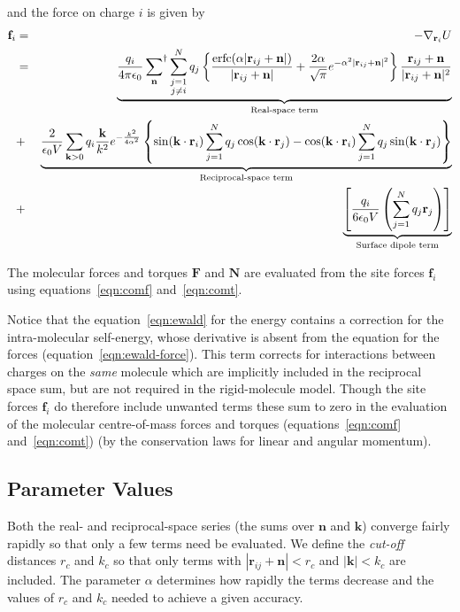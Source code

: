 \documentclass[a4paper,twoside]{report}
\providecommand{\bm}[1]{\mathbf{#1}}
\newcommand{\erfc}{\mbox{erfc}}
\begin{document}
and the force on charge $i$ is given by
\begin{eqnarray}
  \label{eqn:ewald-force}
  \bm{f}_i &=& - \nabla_{\bm{r}_i} U \nonumber \\
  & = & \underbrace{\frac{q_i}{4 \pi \epsilon_0}
    \sideset{}{^\dag}\sum_{\bm{n}} \sum_{\substack{j=1\\j \neq i}}^{N}
    q_j \left \lbrace \frac{\erfc( \alpha | \bm{r}_{ij} + \bm{n} |)}{|
        \bm{r}_{ij} +\bm{n} | } + \frac{2 \alpha}{\sqrt{\pi}}e^{-
        \alpha^2 | \bm{r}_{ij} + \bm{n} |^2} \right \rbrace
    \frac{\bm{r}_{ij} + \bm{n}}{| \bm{r}_{ij} + \bm{n} |^2}
    }_{\textnormal{Real-space term}} \nonumber \\
  & + & \underbrace{\frac{2}{\epsilon_0 V} \sum_{\bm{k} > 0} q_i
    \frac{\bm{k}}{k^2} e^{-\frac{k^2}{4 \alpha^2}} \left \lbrace
      \sin(\bm{k \cdot r}_i) \sum_{j=1}^{N} q_j \cos(\bm{k \cdot r}_j)
      - \cos(\bm{k \cdot r}_i) \sum_{j=1}^{N} q_j \sin(\bm{k \cdot
        r}_j)
    \right \rbrace}_{\textnormal{Reciprocal-space term}}\\
  & + & \underbrace{\left [ \frac{q_i}{6 \epsilon_0 V} \left (
        \sum_{j=1}^N q_j \bm{r}_j \right ) \right
    ]}_{\textnormal{Surface dipole term}} \nonumber
\end{eqnarray}

The molecular forces and torques $\bm{F}$ and $\bm{N}$ are evaluated
from the site forces $\bm{f}_i$ using equations~\ref{eqn:comf} 
and~\ref{eqn:comt}.

Notice that the equation~\ref{eqn:ewald} for the energy contains a
correction for the intra-molecular self-energy, whose derivative is
absent from the equation for the forces
(equation~\ref{eqn:ewald-force}).  This term corrects for interactions
between charges on the \emph{same} molecule which are implicitly
included in the reciprocal space sum, but are not required in the
rigid-molecule model.  Though the site forces $\bm{f}_i$ do therefore
include unwanted terms these sum to zero in the evaluation of the
molecular centre-of-mass forces and torques (equations~\ref{eqn:comf}
and~\ref{eqn:comt}) (by the conservation laws for linear and angular
momentum).

\subsection{Parameter Values}
\label{sec:ewald-auto}

Both the real- and reciprocal-space series (the sums over $\bm{n}$ and
$\bm{k}$) converge fairly rapidly so that only a few terms need be
evaluated.  We define the \emph{cut-off} distances $r_c$ and $k_c$ so
that only terms with $| \bm{r}_{ij} +\bm{n} | < r_c$ and $|\bm{k}| < k_c$
are included.  The parameter $\alpha$ determines how rapidly the terms
decrease and the values of $r_c$ and $k_c$ needed to achieve a given
accuracy. 
\end{document}
